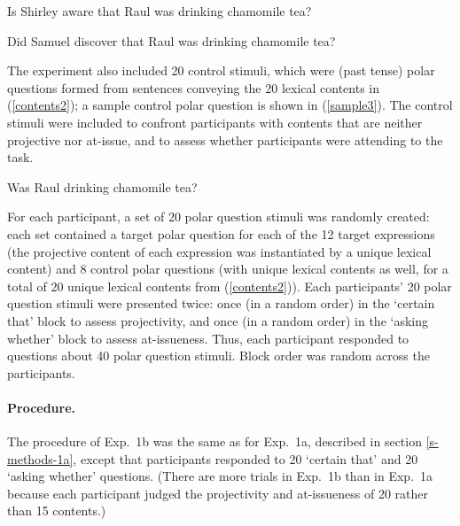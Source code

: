\documentclass[11pt,fleqn]{article}
\newcommand{\6}{\mbox{$[\hspace*{-.6mm}[$}}
\newcommand{\9}{\mbox{$]\hspace*{-.6mm}]$}}
\begin{document}
\begin{exe}
\ex\label{sample2}
\begin{xlist}
\ex Is Shirley aware that Raul was drinking chamomile tea?

\ex Did Samuel discover that Raul was drinking chamomile tea?
\end{xlist}
\end{exe}

The experiment also included 20 control stimuli, which were (past tense) polar questions formed from sentences conveying the 20 lexical contents in (\ref{contents2}); a sample control polar question is shown in (\ref{sample3}). The control stimuli were included to confront participants with contents that are neither projective nor at-issue, and to assess whether participants were attending to the task.

\begin{exe}
\ex\label{sample3} Was Raul drinking chamomile tea?
\end{exe}

For each participant, a set of 20 polar question stimuli was randomly created: each set contained a target polar question for each of the 12 target expressions (the projective content of each expression was instantiated by a unique lexical content) and 8 control polar questions (with unique lexical contents as well, for a total of 20 unique lexical contents from (\ref{contents2})). Each participants' 20 polar question stimuli were presented twice: once (in a random order) in the `certain that' block to assess projectivity, and once (in a random order) in the `asking whether' block to assess at-issueness. Thus, each participant responded to questions about 40 polar question stimuli. Block order was random across the participants.

\paragraph{Procedure.} The procedure of Exp.~1b was the same as for Exp.~1a, described in section \ref{s-methods-1a}, except that participants responded to 20 `certain that' and 20 `asking whether' questions. (There are more trials in Exp.~1b than in Exp.~1a because each participant judged the projectivity and at-issueness of 20  rather than 15 contents.)
\end{document}
